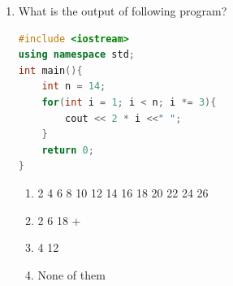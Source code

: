 \documentclass[11pt]{article}
\begin{document}
\begin{enumerate}
\item What is the output of following program?
\begin{lstlisting}[language=C++]
#include <iostream>
using namespace std;
int main(){
    int n = 14;
    for(int i = 1; i < n; i *= 3){
	    cout << 2 * i <<" ";   
    }
    return 0;
}
\end{lstlisting}
\begin{enumerate}
    \item 2 4 6 8 10 12 14 16 18 20 22 24 26
    \item 2 6 18 +
    \item 4 12
    \item None of them
\end{enumerate}


\end{enumerate}
\end{document}
